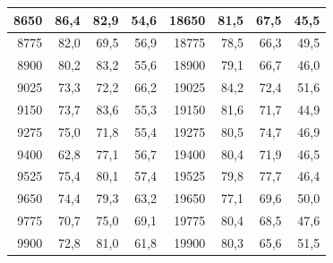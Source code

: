 \begin{small}
\begin{longtable}{|r|r|r|r|r|r|r|r|}
8650 & 86,4 & 82,9 & 54,6 & 18650 & 81,5 & 67,5 & 45,5 \\ \hline
8775 & 82,0 & 69,5 & 56,9 & 18775 & 78,5 & 66,3 & 49,5 \\ \hline
8900 & 80,2 & 83,2 & 55,6 & 18900 & 79,1 & 66,7 & 46,0 \\ \hline
9025 & 73,3 & 72,2 & 66,2 & 19025 & 84,2 & 72,4 & 51,6 \\ \hline
9150 & 73,7 & 83,6 & 55,3 & 19150 & 81,6 & 71,7 & 44,9 \\ \hline
9275 & 75,0 & 71,8 & 55,4 & 19275 & 80,5 & 74,7 & 46,9 \\ \hline
9400 & 62,8 & 77,1 & 56,7 & 19400 & 80,4 & 71,9 & 46,5 \\ \hline
9525 & 75,4 & 80,1 & 57,4 & 19525 & 79,8 & 77,7 & 46,4 \\ \hline
9650 & 74,4 & 79,3 & 63,2 & 19650 & 77,1 & 69,6 & 50,0 \\ \hline
9775 & 70,7 & 75,0 & 69,1 & 19775 & 80,4 & 68,5 & 47,6 \\ \hline
9900 & 72,8 & 81,0 & 61,8 & 19900 & 80,3 & 65,6 & 51,5 \\ \hline
\end{longtable}
\end{small}